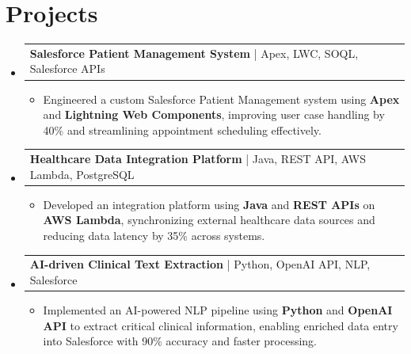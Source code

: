 \documentclass[letterpaper,10pt]{article}
\makeatletter
\newcommand{\resumeItem}[1]{
  \item{\fontsize{8pt}{9pt}\selectfont
    #1 \vspace{-3pt}
  }
}
\newcommand{\resumeProjectHeading}[2]{
    \item
    \begin{tabular*}{1.001\textwidth}{l@{\extracolsep{\fill}}r}
      \fontsize{8.5pt}{10pt}#1 & \textbf{\fontsize{8.5pt}{10pt} #2}\\
    \end{tabular*}\vspace{-7pt}
}
\newcommand{\resumeSubHeadingListStart}{\begin{itemize}[leftmargin=0pt, label={}]}
\newcommand{\resumeSubHeadingListEnd}{\end{itemize}}
\newcommand{\resumeItemListStart}{\begin{itemize}[leftmargin=*]}
\newcommand{\resumeItemListEnd}{\end{itemize}\vspace{-5pt}}
\makeatother
\begin{document}
\section{Projects}
    \vspace{-5pt}
    \resumeSubHeadingListStart
          \resumeProjectHeading
            {\textbf{Salesforce Patient Management System} | Apex, LWC, SOQL, Salesforce APIs}{}
            \resumeItemListStart
                \resumeItem{Engineered a custom Salesforce Patient Management system using \textbf{Apex} and \textbf{Lightning Web Components}, improving user case handling by 40\% and streamlining appointment scheduling effectively.}
            \resumeItemListEnd
        \vspace{-12pt}
    
        \resumeProjectHeading
            {\textbf{Healthcare Data Integration Platform} | Java, REST API, AWS Lambda, PostgreSQL}{}
        \resumeItemListStart
                \resumeItem{Developed an integration platform using \textbf{Java} and \textbf{REST APIs} on \textbf{AWS Lambda}, synchronizing external healthcare data sources and reducing data latency by 35\% across systems.}
        \resumeItemListEnd
      \vspace{-12pt}
      \resumeProjectHeading
        {\textbf{AI-driven Clinical Text Extraction} | Python, OpenAI API, NLP, Salesforce}{}
    \resumeItemListStart
            \resumeItem{Implemented an AI-powered NLP pipeline using \textbf{Python} and \textbf{OpenAI API} to extract critical clinical information, enabling enriched data entry into Salesforce with 90\% accuracy and faster processing.}
    \resumeItemListEnd
    \resumeSubHeadingListEnd
\end{document}
